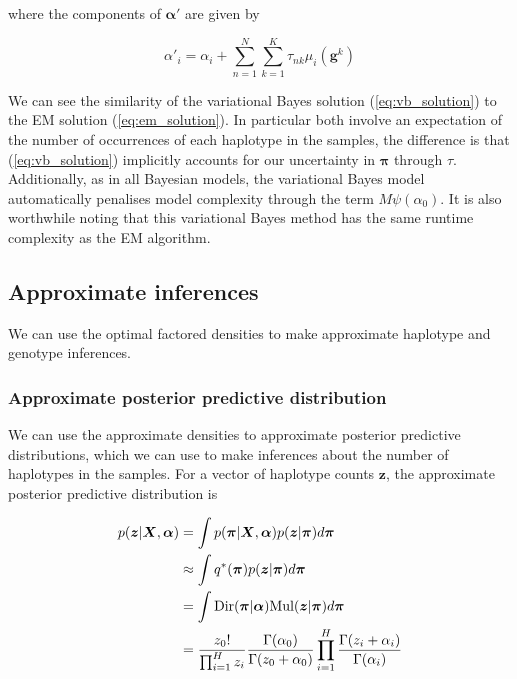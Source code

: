 \documentclass{article}
\begin{document}
where the components of $\boldsymbol{\alpha}'$ are given by

\begin{equation}
\label{eq:vb_solution}
\alpha'_i = \alpha_i + \sum_{n = 1}^N \sum_{k = 1}^K \tau_{nk} \mu_i(\boldsymbol{g}^k)
\end{equation}

We can see the similarity of the variational Bayes solution (\ref{eq:vb_solution}) to the EM solution (\ref{eq:em_solution}). In particular both involve an expectation of the number of occurrences of each haplotype in the samples, the difference is that (\ref{eq:vb_solution}) implicitly accounts for our uncertainty in $\boldsymbol{\pi}$ through $\tau$. Additionally, as in all Bayesian models, the variational Bayes model automatically penalises model complexity through the term $M\psi(\alpha_0)$. It is also worthwhile noting that this variational Bayes method has the same runtime complexity as the EM algorithm.

\subsection{Approximate inferences}

We can use the optimal factored densities to make approximate haplotype and genotype inferences. 

\subsubsection{Approximate posterior predictive distribution}

We can use the approximate densities to approximate posterior predictive distributions, which we can use to make inferences about the number of haplotypes in the samples. For a vector of haplotype counts $\boldsymbol{z}$, the approximate posterior predictive distribution is

\begin{align}
\label{eq:z_pp}
    p(\boldsymbol{z} | \boldsymbol{X}, \boldsymbol{\alpha}) &= \int p(\boldsymbol{\pi} | \boldsymbol{X}, \boldsymbol{\alpha}) p(\boldsymbol{z} | \boldsymbol{\pi}) d\boldsymbol{\pi}\notag\\
    &\approx \int q^*(\boldsymbol{\pi}) p(\boldsymbol{z} | \boldsymbol{\pi}) d\boldsymbol{\pi}\notag\\
    &= \int \text{Dir}(\boldsymbol{\pi} | \boldsymbol{\alpha}) \text{Mul}(\boldsymbol{z} | \boldsymbol{\pi}) d\boldsymbol{\pi}\notag\\
    &= \frac{z_0!}{\prod_{i = 1}^{H} z_i} \frac{\Gamma(\alpha_0)}{\Gamma(z_0 + \alpha_0)} \prod_{i = 1}^H \frac{\Gamma(z_i + \alpha_i)}{\Gamma(\alpha_i)}
\end{align}
\end{document}
